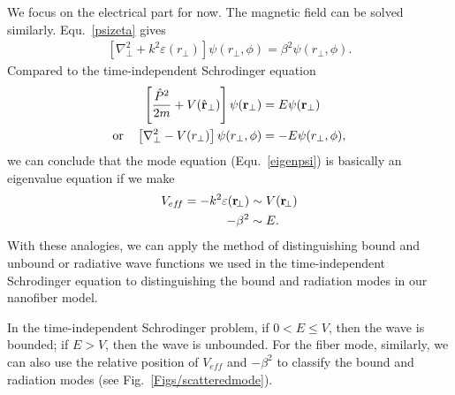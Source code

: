 We focus on the electrical part for now. The magnetic field can be solved similarly. Equ.~\ref{psizeta} 
gives
\begin{align}\label{eigenpsi}
[\nabla^2_\perp + k^2\varepsilon(r_\perp)] \psi(r_\perp, \phi) = \beta^2\psi(r_\perp,\phi).
\end{align}
Compared to the time-independent Schrodinger equation
\begin{align}
\left[\frac{\hat{P}^2}{2m}+V(\hat{\mathbf{r}}_\perp) \right] \psi(\mathbf{r}_\perp)&= E\psi(\mathbf{r}_\perp)\\
\text{or}\quad \left[ \nabla^2_\perp -V(r_\perp) \right] \psi (r_\perp, \phi) &= -E\psi(r_\perp,\phi),
\end{align}
we can conclude that the mode equation (Equ.~\ref{eigenpsi}) is basically an eigenvalue equation if we 
make 
\begin{align}
V_{ef\!f}=-k^2\varepsilon(\mathbf{r}\!_\perp) &\sim V(\mathbf{r}\!_\perp)\\
-\beta^2 &\sim E.
\end{align}
With these analogies, we can apply the method of distinguishing bound and unbound or radiative wave 
functions we used in the time-independent Schrodinger equation to distinguishing the bound and 
radiation modes in our nanofiber model. 

In the time-independent Schrodinger problem, if $ 0<E\leq V $, then the wave is bounded; if $ E>V $, 
then the wave is unbounded. For the fiber mode, similarly, we can also use the relative position of $ 
V_{ef\!f} $ and $ -\beta^2 $ to classify the bound and radiation modes (see 
Fig.~\ref{Figs/scatteredmode}).


